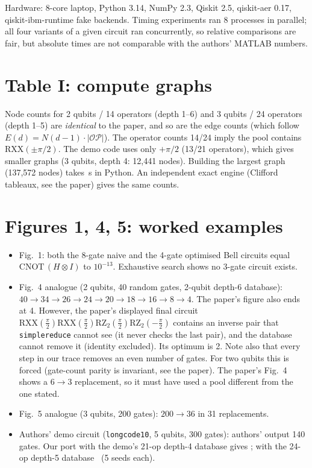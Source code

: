\documentclass[11pt,a4paper]{article}
\begin{document}
Hardware: 8-core laptop, Python 3.14, NumPy 2.3, Qiskit 2.5, qiskit-aer 0.17, qiskit-ibm-runtime fake backends.
Timing experiments ran 8 processes in parallel; all four variants of a given circuit ran concurrently, so
relative comparisons are fair, but absolute times are not comparable with the authors' MATLAB numbers.

\section{Table I: compute graphs}
Node counts for 2 qubits / 14 operators (depth 1--6) and 3 qubits / 24 operators (depth 1--5) are \emph{identical} to the
paper, and so are the edge counts (which follow $E(d)=N(d{-}1)\cdot|\mathcal{OP}|$). The operator counts 14/24 imply the pool
contains $\mathrm{RXX}(\pm\pi/2)$. The demo code uses only $+\pi/2$ (13/21 operators), which gives smaller graphs
(3 qubits, depth 4: 12,441 nodes). Building the largest graph (137,572 nodes) takes \BuildSecondsBig\,s in Python.
An independent exact engine (Clifford tableaux, see the paper) gives the same counts.

\section{Figures 1, 4, 5: worked examples}
\begin{itemize}[nosep]
\item Fig.~1: both the 8-gate naive and the 4-gate optimised Bell circuits equal $\mathrm{CNOT}\,(H\otimes I)$ to $10^{-13}$.
  Exhaustive search shows no 3-gate circuit exists.
\item Fig.~4 analogue (2 qubits, 40 random gates, 2-qubit depth-6 database): $40\to34\to26\to24\to20\to18\to16\to8\to4$.
  The paper's figure also ends at 4. However, the paper's displayed final circuit
  $\mathrm{RXX}(\frac\pi2)\mathrm{RXX}(\frac\pi2)\mathrm{RZ}_2(\frac\pi2)\mathrm{RZ}_2(-\frac\pi2)$ contains an inverse pair that
  \texttt{simplereduce} cannot see (it never checks the last pair), and the database cannot remove it (identity excluded).
  Its optimum is 2. Note also that every step in our trace removes an even number of gates. For two qubits this is
  forced (gate-count parity is invariant, see the paper). The paper's Fig.~4 shows a $6\to3$ replacement, so it
  must have used a pool different from the one stated.
\item Fig.~5 analogue (3 qubits, 200 gates): $200\to36$ in 31 replacements.
\item Authors' demo circuit (\texttt{longcode10}, 5 qubits, 300 gates): authors' output 140 gates. Our port with the demo's
  21-op depth-4 database gives \DemoDfour; with the 24-op depth-5 database \DemoDfive\ (5 seeds each).
\end{itemize}
\end{document}
